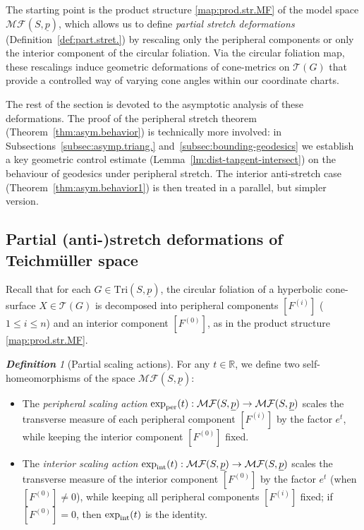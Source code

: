 \documentclass[11pt, letterpaper]{amsart}
\theoremstyle{definition}
\theoremstyle{remark}
\newtheorem{definition}[theorem]{\rm\bf Definition}
\newcommand{\up}{\underline{p}}
\newcommand{\Sp}{(S,\up)}
\newcommand{\TSp}{\text{Tri}\Sp}
\newcommand{\cMFp}{\mathcal{MF} (S,\up)}
\newcommand{\cT}{\mathcal{T}}
\newcommand{\DEF}{} \newcommand{\WARN}{\textcolor{red}} \newcommand{\ALT}{\textcolor{brown}} \newcommand{\TODO}{\textcolor{teal}} %
\numberwithin{equation}{section}
\begin{document}
The starting point is the product structure \eqref{map:prod.str.MF} of the model space \(\cMFp\), which allows us to define \emph{partial stretch deformations} (Definition~\ref{def:part.stret.}) by rescaling only the peripheral components or only the interior component of the circular foliation.
Via the circular foliation map, these rescalings induce geometric deformations of cone-metrics on \(\cT(G)\) that provide a controlled way of varying cone angles within our coordinate charts.

The rest of the section is devoted to the asymptotic analysis of these deformations.
The proof of the peripheral stretch theorem (Theorem~\ref{thm:asym.behavior}) is technically more involved: in Subsections~\ref{subsec:asymp.triang.} and~\ref{subsec:bounding-geodesics} we establish a key geometric control estimate (Lemma~\ref{lm:dist-tangent-intersect}) on the behaviour of geodesics under peripheral stretch.
The interior anti-stretch case (Theorem~\ref{thm:asym.behavior1}) is then treated in a parallel, but simpler version.



\subsection{Partial (anti-)stretch deformations of Teichm\"uller space}
\label{subsec:part.stretch.deform.}

Recall that for each $G\in\TSp$, the circular foliation of a hyperbolic cone-surface $X\in\cT(G)$ is decomposed into peripheral components $[F^{(i)}]$ ($1\leq i\leq n$) and an interior component $[F^{(0)}]$, as in the product structure \eqref{map:prod.str.MF}.

\begin{definition}[Partial scaling actions]
\label{def:peripheral.scaling}
For any $t \in \mathbb{R}$, we define two self-homeomorphisms of the space $\cMFp$:
\begin{itemize}
    \item The \DEF{\em peripheral scaling action} ${\rm exp}_{\mathrm{per}}(t): \cMFp \to \cMFp$ scales the transverse measure of each peripheral component $[F^{(i)}]$ by the factor $e^t$, while keeping the interior component $[F^{(0)}]$ fixed.
    \item The \DEF{\em interior scaling action} ${\rm exp}_{\mathrm{int}}(t): \cMFp \to \cMFp$ scales the transverse measure of the interior component $[F^{(0)}]$ by the factor $e^t$ (when $[F^{(0)}]\neq 0$), while keeping all peripheral components $[F^{(i)}]$ fixed; if $[F^{(0)}]=0$, then ${\rm exp}_{\mathrm{int}}(t)$ is the identity.
\end{itemize}
\end{definition}
\end{document}
